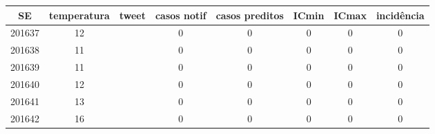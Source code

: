 \begin{tabular}{c|ccccccc}
  \hline
SE & temperatura & tweet & casos notif & casos preditos & ICmin & ICmax & incidência \\ 
  \hline
201637 & 12 &  & 0 & 0 & 0 & 0 & 0 \\ 
  201638 & 11 &  & 0 & 0 & 0 & 0 & 0 \\ 
  201639 & 11 &  & 0 & 0 & 0 & 0 & 0 \\ 
  201640 & 12 &  & 0 & 0 & 0 & 0 & 0 \\ 
  201641 & 13 &  & 0 & 0 & 0 & 0 & 0 \\ 
  201642 & 16 &  & 0 & 0 & 0 & 0 & 0 \\ 
   \hline
\end{tabular}
